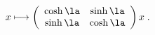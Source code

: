 \begin{equation*}
  x\longmapsto\left(
    \begin{array}{cc}
      \cosh\la & \sinh\la\\
      \sinh\la & \cosh\la
    \end{array}
  \right)x\;.
\end{equation*}

